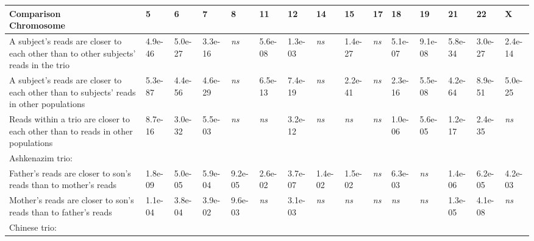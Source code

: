 \begin{samepage} \begin{table}[h!] \small \begin{tabular}{lllllllllllllll}
\hline
\textbf{Comparison\\Chromosome}                                                         & \textbf{5}  & \textbf{6}  & \textbf{7}  & \textbf{8}  & \textbf{11} & \textbf{12} & \textbf{14} & \textbf{15} & \textbf{17} & \textbf{18} & \textbf{19} & \textbf{21} & \textbf{22} & \textbf{X}  \\
\hline
A subject's reads are closer to each other than to other subjects' reads in the trio    & 4.9e-46     & 5.0e-27     & 3.3e-16     & \textit{ns} & 5.6e-08     & 1.3e-03     & \textit{ns} & 1.4e-27     & \textit{ns} & 5.1e-07     & 9.1e-08     & 5.8e-34     & 3.0e-27     & 2.4e-14     \\
A subject's reads are closer to each other than to subjects' reads in other populations & 5.3e-87     & 4.4e-56     & 4.6e-29     & \textit{ns} & 6.5e-13     & 7.4e-19     & \textit{ns} & 2.2e-41     & \textit{ns} & 2.3e-16     & 5.5e-08     & 4.2e-64     & 8.9e-51     & 5.0e-25     \\
Reads within a trio are closer to each other than to reads in other populations         & 8.7e-16     & 3.0e-32     & 5.5e-03     & \textit{ns} & \textit{ns} & 3.2e-12     & \textit{ns} & \textit{ns} & \textit{ns} & 1.0e-06     & 5.6e-05     & 1.2e-17     & 2.4e-35     & \textit{ns} \\
Ashkenazim trio:                                                                        & \textbf{}   & \textbf{}   & \textbf{}   & \textbf{}   &  \textbf{}  & \textbf{}   & \textbf{}   & \textbf{}   & \textbf{}   & \textbf{}   & \textbf{}   & \textbf{}   & \textbf{}   & \textbf{}   \\
Father's reads are closer to son's reads than to mother's reads                         & 1.8e-09     & 5.0e-05     & 5.9e-04     & 9.2e-05     & 2.6e-02     & 3.7e-07     & 1.4e-02     & 1.5e-02     & \textit{ns} & 6.3e-03     & \textit{ns} & 1.4e-06     & 6.2e-05     & 4.2e-03     \\
Mother's reads are closer to son's reads than to father's reads                         & 1.1e-04     & 3.8e-04     & 3.9e-02     & 9.6e-03     & \textit{ns} & 3.1e-03     & \textit{ns} & \textit{ns} & \textit{ns} & \textit{ns} & \textit{ns} & 1.3e-05     & 4.1e-08     & \textit{ns} \\
Chinese trio:                                                                           & \textbf{}   & \textbf{}   & \textbf{}   & \textbf{}   &  \textbf{}  & \textbf{}   & \textbf{}   & \textbf{}   & \textbf{}   & \textbf{}   & \textbf{}   & \textbf{}   & \textbf{}   & \textbf{}   \\

\end{tabular}
\end{table}
\end{samepage}
